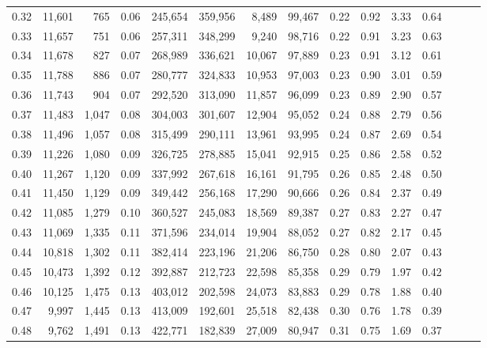 \begin{tabular}{rrrrrrrrrrrrrrr}
0.32 &  11,601 &    765 &  0.06 &  245,654 &  359,956 &    8,489 &   99,467 &  0.22 &  0.92 &  3.33 &      0.64 \\
0.33 &  11,657 &    751 &  0.06 &  257,311 &  348,299 &    9,240 &   98,716 &  0.22 &  0.91 &  3.23 &      0.63 \\
0.34 &  11,678 &    827 &  0.07 &  268,989 &  336,621 &   10,067 &   97,889 &  0.23 &  0.91 &  3.12 &      0.61 \\
0.35 &  11,788 &    886 &  0.07 &  280,777 &  324,833 &   10,953 &   97,003 &  0.23 &  0.90 &  3.01 &      0.59 \\
0.36 &  11,743 &    904 &  0.07 &  292,520 &  313,090 &   11,857 &   96,099 &  0.23 &  0.89 &  2.90 &      0.57 \\
0.37 &  11,483 &  1,047 &  0.08 &  304,003 &  301,607 &   12,904 &   95,052 &  0.24 &  0.88 &  2.79 &      0.56 \\
0.38 &  11,496 &  1,057 &  0.08 &  315,499 &  290,111 &   13,961 &   93,995 &  0.24 &  0.87 &  2.69 &      0.54 \\
0.39 &  11,226 &  1,080 &  0.09 &  326,725 &  278,885 &   15,041 &   92,915 &  0.25 &  0.86 &  2.58 &      0.52 \\
0.40 &  11,267 &  1,120 &  0.09 &  337,992 &  267,618 &   16,161 &   91,795 &  0.26 &  0.85 &  2.48 &      0.50 \\
0.41 &  11,450 &  1,129 &  0.09 &  349,442 &  256,168 &   17,290 &   90,666 &  0.26 &  0.84 &  2.37 &      0.49 \\
0.42 &  11,085 &  1,279 &  0.10 &  360,527 &  245,083 &   18,569 &   89,387 &  0.27 &  0.83 &  2.27 &      0.47 \\
0.43 &  11,069 &  1,335 &  0.11 &  371,596 &  234,014 &   19,904 &   88,052 &  0.27 &  0.82 &  2.17 &      0.45 \\
0.44 &  10,818 &  1,302 &  0.11 &  382,414 &  223,196 &   21,206 &   86,750 &  0.28 &  0.80 &  2.07 &      0.43 \\
0.45 &  10,473 &  1,392 &  0.12 &  392,887 &  212,723 &   22,598 &   85,358 &  0.29 &  0.79 &  1.97 &      0.42 \\
0.46 &  10,125 &  1,475 &  0.13 &  403,012 &  202,598 &   24,073 &   83,883 &  0.29 &  0.78 &  1.88 &      0.40 \\
0.47 &   9,997 &  1,445 &  0.13 &  413,009 &  192,601 &   25,518 &   82,438 &  0.30 &  0.76 &  1.78 &      0.39 \\
0.48 &   9,762 &  1,491 &  0.13 &  422,771 &  182,839 &   27,009 &   80,947 &  0.31 &  0.75 &  1.69 &      0.37 \\

\end{tabular}
